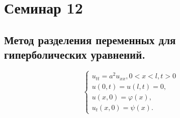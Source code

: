 \documentclass[11pt]{article}
\def\zall{\setcounter{lem}{0}\setcounter{cnsqnc}{0}\setcounter{th}{0}\setcounter{Cmt}{0}\setcounter{equation}{0}}
\newcounter{lem}\setcounter{lem}{0}
\newcounter{th}\setcounter{th}{0}
\newcounter{cnsqnc}\setcounter{cnsqnc}{0}
\newcounter{Cmt}\setcounter{Cmt}{0}
\begin{document}
\section{Семинар 12}
\label{sec:org89a084c}
\zall
\subsection{Метод разделения переменных для гиперболических уравнений.}
\label{sec:org08b8250}
\begin{equation}
\begin{cases}
u_{tt} = a^2u_{xx}, 0 < x < l, t > 0\\
u(0, t) = u(l, t) = 0, \\
u(x, 0) = \varphi(x), \\
u_t(x, 0) = \psi(x).
\end{cases}
\end{equation}
\end{document}
